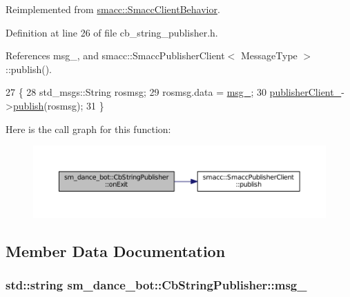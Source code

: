 Reimplemented from \hyperlink{classsmacc_1_1SmaccClientBehavior_ac0cd72d42bd00425362a97c9803ecce5}{smacc\+::\+Smacc\+Client\+Behavior}.



Definition at line 26 of file cb\+\_\+string\+\_\+publisher.\+h.



References msg\+\_\+, and smacc\+::\+Smacc\+Publisher\+Client$<$ Message\+Type $>$\+::publish().


\begin{DoxyCode}
27     \{
28         std\_msgs::String rosmsg;
29         rosmsg.data = \hyperlink{classsm__dance__bot_1_1CbStringPublisher_a57ebf1bedad677d9a4b40b8df271a904}{msg\_};
30         \hyperlink{classsm__dance__bot_1_1CbStringPublisher_a18e8333d818203fbbb6e53b0c3fb5035}{publisherClient\_}->\hyperlink{classsmacc_1_1SmaccPublisherClient_aa635210d9104a5b6f3ea15cb2bf16518}{publish}(rosmsg);
31     \}
\end{DoxyCode}


Here is the call graph for this function\+:
\nopagebreak
\begin{figure}[H]
\begin{center}
\leavevmode
\includegraphics[width=350pt]{classsm__dance__bot_1_1CbStringPublisher_a487d8302e60f01401a7d189382ba5f73_cgraph}
\end{center}
\end{figure}




\subsection{Member Data Documentation}
\subsubsection[{\texorpdfstring{msg\+\_\+}{msg_}}]{\setlength{\rightskip}{0pt plus 5cm}std\+::string sm\+\_\+dance\+\_\+bot\+::\+Cb\+String\+Publisher\+::msg\+\_\+}\hypertarget{classsm__dance__bot_1_1CbStringPublisher_a57ebf1bedad677d9a4b40b8df271a904}{}\label{classsm__dance__bot_1_1CbStringPublisher_a57ebf1bedad677d9a4b40b8df271a904}


